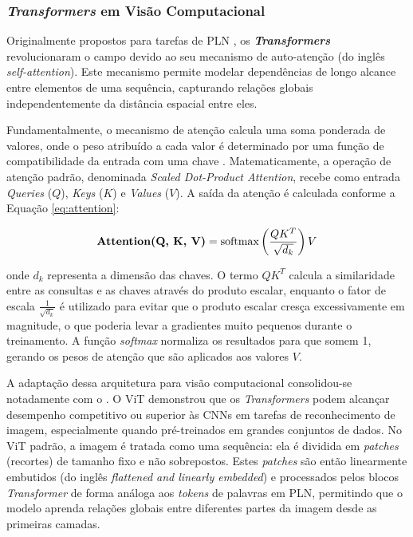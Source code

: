 \subsubsection{\textit{Transformers} em Visão Computacional}\label{subsubsec:transformers_visao}

Originalmente propostos para tarefas de PLN \cite{Vaswani2017}, os \textbf{\textit{Transformers}} revolucionaram o campo devido ao seu mecanismo de auto-atenção (do inglês \textit{self-attention}). Este mecanismo permite modelar dependências de longo alcance entre elementos de uma sequência, capturando relações globais independentemente da distância espacial entre eles.

Fundamentalmente, o mecanismo de atenção calcula uma soma ponderada de valores, onde o peso atribuído a cada valor é determinado por uma função de compatibilidade da entrada com uma chave \cite{Vaswani2017}. Matematicamente, a operação de atenção padrão, denominada \textit{Scaled Dot-Product Attention}, recebe como entrada \textit{Queries} ($Q$), \textit{Keys} ($K$) e \textit{Values} ($V$). A saída da atenção é calculada conforme a Equação \ref{eq:attention}:

\begin{equation} \label{eq:attention}
    \textbf{\text{Attention}(Q, K, V)} = \text{softmax}\left(\frac{QK^T}{\sqrt{d_k}}\right)V
\end{equation}

\noindent onde $d_k$ representa a dimensão das chaves. O termo $QK^T$ calcula a similaridade entre as consultas e as chaves através do produto escalar, enquanto o fator de escala $\frac{1}{\sqrt{d_k}}$ é utilizado para evitar que o produto escalar cresça excessivamente em magnitude, o que poderia levar a gradientes muito pequenos durante o treinamento. A função \textit{softmax} normaliza os resultados para que somem 1, gerando os pesos de atenção que são aplicados aos valores $V$.

A adaptação dessa arquitetura para visão computacional consolidou-se notadamente com o  \cite{Dosovitskiy2021}. O ViT demonstrou que os \textit{Transformers} podem alcançar desempenho competitivo ou superior às CNNs em tarefas de reconhecimento de imagem, especialmente quando pré-treinados em grandes conjuntos de dados. No ViT padrão, a imagem é tratada como uma sequência: ela é dividida em \textit{patches} (recortes) de tamanho fixo e não sobrepostos. Estes \textit{patches} são então linearmente embutidos (do inglês \textit{flattened and linearly embedded}) e processados pelos blocos \textit{Transformer} de forma análoga aos \textit{tokens} de palavras em PLN, permitindo que o modelo aprenda relações globais entre diferentes partes da imagem desde as primeiras camadas.

